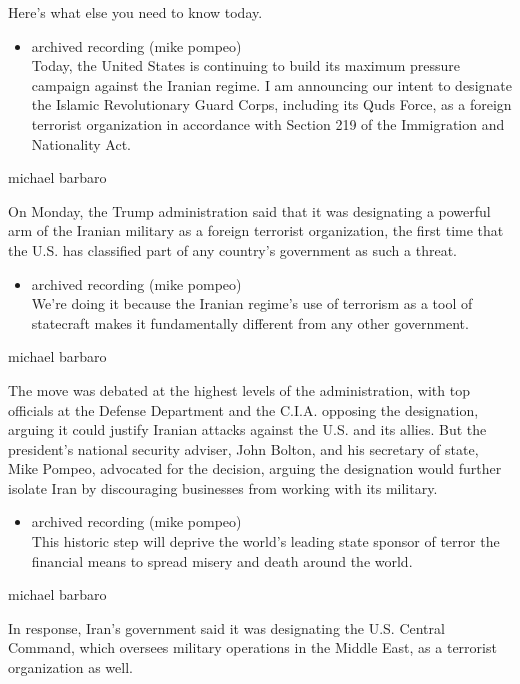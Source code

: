 Here's what else you need to know today.

\begin{itemize}
\tightlist
\item
  archived recording (mike pompeo)\\
  Today, the United States is continuing to build its maximum pressure
  campaign against the Iranian regime. I am announcing our intent to
  designate the Islamic Revolutionary Guard Corps, including its Quds
  Force, as a foreign terrorist organization in accordance with Section
  219 of the Immigration and Nationality Act.
\end{itemize}

michael barbaro

On Monday, the Trump administration said that it was designating a
powerful arm of the Iranian military as a foreign terrorist
organization, the first time that the U.S. has classified part of any
country's government as such a threat.

\begin{itemize}
\tightlist
\item
  archived recording (mike pompeo)\\
  We're doing it because the Iranian regime's use of terrorism as a tool
  of statecraft makes it fundamentally different from any other
  government.
\end{itemize}

michael barbaro

The move was debated at the highest levels of the administration, with
top officials at the Defense Department and the C.I.A. opposing the
designation, arguing it could justify Iranian attacks against the U.S.
and its allies. But the president's national security adviser, John
Bolton, and his secretary of state, Mike Pompeo, advocated for the
decision, arguing the designation would further isolate Iran by
discouraging businesses from working with its military.

\begin{itemize}
\tightlist
\item
  archived recording (mike pompeo)\\
  This historic step will deprive the world's leading state sponsor of
  terror the financial means to spread misery and death around the
  world.
\end{itemize}

michael barbaro

In response, Iran's government said it was designating the U.S. Central
Command, which oversees military operations in the Middle East, as a
terrorist organization as well.

